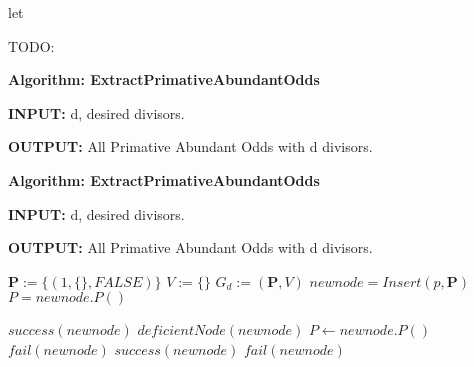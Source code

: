 \documentclass[../paper.tex]{subfiles}
\begin{document}
let 

\begin {algorithmic}
\STATE TODO: 

\end {algorithmic}
{\setlength{\parindent}{0cm}

\textbf{Algorithm: ExtractPrimativeAbundantOdds}

\textbf{INPUT:} d, desired divisors.

\textbf{OUTPUT:} All Primative Abundant Odds with d divisors.

}


{\setlength{\parindent}{0cm}

\textbf{Algorithm: ExtractPrimativeAbundantOdds}

\textbf{INPUT:} d, desired divisors.

\textbf{OUTPUT:} All Primative Abundant Odds with d divisors.

}

\begin{algorithmic}

\STATE $\mathbf{P} := \{(1, \{\}, FALSE)\}$
\STATE $V := \{\}$
\STATE $G_d := (\mathbf{P},V)$
	\STATE $newnode = Insert(p,\mathbf{P})$ 
	\STATE $P = newnode.P()$
	\STATE


			\STATE $success(newnode)$
		\ELSE
			\STATE $deficientNode(newnode)$
			\STATE $P \leftarrow newnode.P()$
		\ENDIF
	\ENDIF
			\STATE $fail(newnode)$
		\ENDIF
			\STATE $success(newnode)$
		\ELSE
			\STATE $fail(newnode)$
		\ENDIF
	\ENDIF

\ENDWHILE
%
\end{algorithmic}
\end{document}
